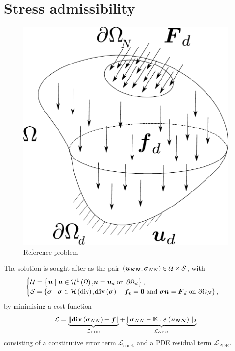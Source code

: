 \section{Stress admissibility}
\begin{figure}
	\vspace{-60pt}
	\flushright
	\includegraphics[width=0.6\linewidth]{Figures/Omega.pdf}
	\caption{Reference problem}
	\label{fig:Body}
\end{figure}
The solution is sought after as the pair $\left(\boldsymbol{u_{NN}},\mathcal{\boldsymbol{\sigma}}_{NN}\right) \in \mathcal{U}  \times \mathcal{S}$, with
\begin{equation}
	\begin{cases}
	\mathcal{U} = \left\{\boldsymbol{u} \; | \; \boldsymbol{u}\in \mathcal{H}^1\left(\Omega\right)\text{,} 
	\boldsymbol{u} = \boldsymbol{u}_d \text{ on } \partial \Omega_d \right\}, \\
		\mathcal{S} = \left\{\mathcal{\boldsymbol{\sigma}} \; | \; \mathcal{\boldsymbol{\sigma}}\in \mathcal{H}\left(\text{div}\right)\text{,} \text{\textbf{div}}\left(\mathcal{\boldsymbol{\sigma}}\right)+\boldsymbol{f_v} = \boldsymbol{0}\text{ and }
	\mathcal{\boldsymbol{\sigma}}\boldsymbol{n} = \boldsymbol{F}_d \text{ on } \partial \Omega_N \right\}, 
	\end{cases}
\end{equation}
by minimising a cost function 
\begin{equation*}
	\mathcal{L} = \underbrace{\Vert \text{\textbf{div}}\left(\mathcal{\boldsymbol{\sigma}}_{NN}\right)+\boldsymbol{f}\Vert}_{\mathcal{L}_{\text{PDE}}} + \underbrace{ \Vert \mathcal{\boldsymbol{\sigma}}_{NN} - \mathbb{K}:\mathcal{\boldsymbol{\varepsilon}}\left(\boldsymbol{u_{NN}}\right) \Vert_{2}}_{\mathcal{L}_{\text{const}}}
\end{equation*} consisting of a constitutive error term $\mathcal{L}_{\text{const}}$ and a PDE residual term $\mathcal{L}_{\text{PDE}}$.
